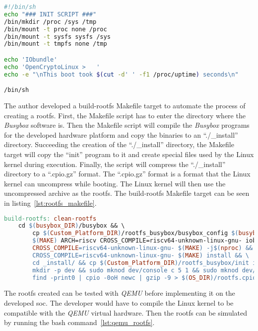 \begin{lstlisting}[language=sh, caption={\enquote{init} script.}, label=lst:rootfs_init]
#!/bin/sh
echo "### INIT SCRIPT ###"
/bin/mkdir /proc /sys /tmp
/bin/mount -t proc none /proc
/bin/mount -t sysfs sysfs /sys
/bin/mount -t tmpfs none /tmp

echo 'IObundle'
echo 'OpenCryptoLinux >   '
echo -e "\nThis boot took $(cut -d' ' -f1 /proc/uptime) seconds\n"

/bin/sh    
\end{lstlisting}

The author developed a build-\acrlong{rootfs} Makefile target to automate the process of creating a \acrlong{rootfs}. First, the Makefile script has to enter the directory where the \textit{Busybox} software is. Then the Makefile script will compile the \textit{Busybox} programs for the developed hardware platform and copy the binaries to an \enquote{./\_install} directory. Succeeding the creation of the \enquote{./\_install} directory, the Makefile target will copy the \enquote{init} program to it and create special files used by the Linux kernel during execution. Finally, the script will compress the \enquote{./\_install} directory to a \enquote{.cpio.gz} format. The \enquote{.cpio.gz} format is a format that the Linux kernel can uncompress while booting. The Linux kernel will then use the uncompressed archive as the \acrlong{rootfs}. The build-\acrlong{rootfs} Makefile target can be seen in listing~\ref{lst:rootfs_makefile}.

\begin{lstlisting}[language=make, caption={Root file system Makefile target.}, label=lst:rootfs_makefile]
build-rootfs: clean-rootfs
    cd $(busybox_DIR)/busybox && \
        cp $(Custom_Platform_DIR)/rootfs_busybox/busybox_config $(busybox_DIR)/busybox/configs/iob_defconfig && \
        $(MAKE) ARCH=riscv CROSS_COMPILE=riscv64-unknown-linux-gnu- iob_defconfig && \
        CROSS_COMPILE=riscv64-unknown-linux-gnu- $(MAKE) -j$(nproc) && \
        CROSS_COMPILE=riscv64-unknown-linux-gnu- $(MAKE) install && \
        cd _install/ && cp $(Custom_Platform_DIR)/rootfs_busybox/init init && \
        mkdir -p dev && sudo mknod dev/console c 5 1 && sudo mknod dev/ram0 b 1 0 && \
        find -print0 | cpio -0oH newc | gzip -9 > $(OS_DIR)/rootfs.cpio.gz
\end{lstlisting}

The \acrshort{rootfs} created can be tested with \textit{QEMU} before implementing it on the developed \acrshort{soc}. The developer would have to compile the Linux kernel to be compatible with the \textit{QEMU} virtual hardware. Then the \acrshort{rootfs} can be simulated by running the bash command~\ref{lst:qemu_rootfs}.

